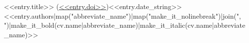 \begin{cvpublicationsubsection}[2]{<<entry.title>> (\href{<<entry.doi_url>>}{<<entry.doi>>})}{}{<<entry.date_string>>}	
<<entry.authors|map("abbreviate_name")|map("make_it_nolinebreak")|join(", ")|make_it_bold(cv.name|abbreviate_name)|make_it_italic(cv.name|abbreviate_name)>>
\end{cvpublicationsubsection}